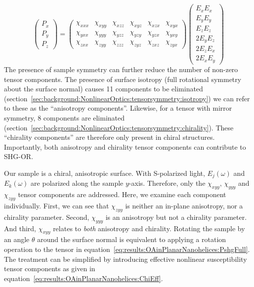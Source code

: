 \begin{equation}\label{eq:results:OAinPlanarNanohelices:PshgFull}
	\begin{pmatrix}
		P_{x}\\ 
		P_{y}\\ 
		P_{z}
	\end{pmatrix} =
	\begin{pmatrix}
		\chi_{xxx} & \chi_{xyy} & \chi_{xzz} & \chi_{xyz} & \chi_{xzx} & \chi_{xyx}\\ 
		\chi_{yxx} & \chi_{yyy} & \chi_{yzz} & \chi_{yzy} & \chi_{yzx} & \chi_{yxy}\\ 
		\chi_{zxx} & \chi_{zyy} & \chi_{zzz} & \chi_{zyz} & \chi_{zxz} & \chi_{zyx}
	\end{pmatrix}
	\begin{pmatrix}
		E_{x}E_{x}\\ 
		E_{y}E_{y}\\ 
		E_{z}E_{z}\\
		2E_{y}E_{z}\\ 
		2E_{z}E_{x}\\ 
		2E_{x}E_{y}
	\end{pmatrix}
\end{equation}
The presence of sample symmetry can further reduce the number of non-zero tensor components. The presence of surface isotropy (full rotational symmetry about the surface normal) causes 11 components to be eliminated (section~\ref{sec:background:NonlinearOptics:tensorsymmetry:isotropy}) we can refer to these as the ``anisotropy components''. Likewise, for a tensor with mirror symmetry, 8 components are eliminated  (section~\ref{sec:background:NonlinearOptics:tensorsymmetry:chirality}). These ``chirality components'' are therefore only present in chiral structures. Importantly, both anisotropy and chirality tensor components can contribute to SHG-OR. 

Our sample is a chiral, anisotropic surface. With S-polarized light, ${E_j}(\omega)$ and ${E_k}(\omega)$ are polarized along the sample $y$-axis. Therefore, only the $\chi_{xyy}$, $\chi_{yyy}$ and $\chi_{zyy}$ tensor components are addressed. Here, we examine each component individually. 
First, we can see that $\chi_{zyy}$ is neither an in-plane anisotropy, nor a chirality parameter. Second, $\chi_{yyy}$ is an anisotropy but not a chirality parameter. And third, $\chi_{xyy}$ relates to \textit{both} anisotropy and chirality. 
Rotating the sample by an angle $\theta$ around the surface normal is equivalent to applying a rotation operation to the tensor in equation~\ref{eq:results:OAinPlanarNanohelices:PshgFull}. The treatment can be simplified by introducing effective nonlinear susceptibility tensor components as given in equation~\ref{eq:results:OAinPlanarNanohelices:ChiEff}.

